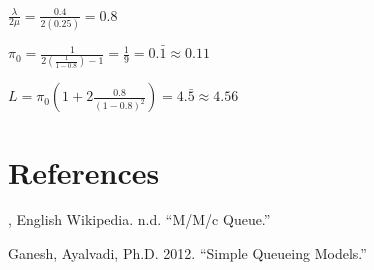 \documentclass[]{article}
\begin{document}
\(\frac{\lambda}{2 \mu} = \frac{0.4}{2(0.25)} = 0.8\)

\(\pi_0 = \frac{1}{2(\frac{1}{1-0.8}) - 1} = \frac{1}{9} = 0. \bar{1} \approx 0.11\)

\(L = \pi_0 (1 + 2 \frac{0.8}{(1-0.8)^2}) = 4. \bar{5} \approx 4.56\)

\hypertarget{references}{%
\section*{References}\label{references}}

\hypertarget{refs}{}
\leavevmode\hypertarget{ref-wiki1}{}%
, English Wikipedia. n.d. ``M/M/c Queue.''

\leavevmode\hypertarget{ref-qm1}{}%
Ganesh, Ayalvadi, Ph.D. 2012. ``Simple Queueing Models.''
\end{document}
